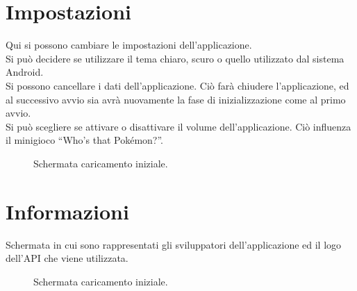\documentclass[a4paper,11pt]{article}
\begin{document}
  \section{Impostazioni}
  Qui si possono cambiare le impostazioni dell’applicazione.\\
Si può decidere se utilizzare il tema chiaro, scuro o quello utilizzato dal sistema Android.\\
Si possono cancellare i dati dell’applicazione. Ciò farà chiudere l’applicazione, ed al successivo avvio sia avrà nuovamente la fase di inizializzazione come al primo avvio.\\
Si può scegliere se attivare o disattivare il volume dell’applicazione. Ciò influenza il minigioco “Who’s that Pokémon?”.\\
  \begin{figure}[h!]
    \centering
  \caption{Schermata caricamento iniziale.}
\end{figure}
\newpage

\section{Informazioni}
Schermata in cui sono rappresentati gli sviluppatori dell’applicazione ed il logo dell’API che viene utilizzata.
  \begin{figure}[h!]
    \centering
  \caption{Schermata caricamento iniziale.}
\end{figure}
\end{document}
